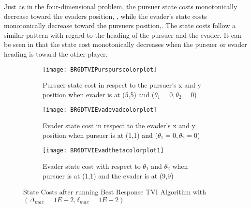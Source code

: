 Just as in the four-dimensional problem, the pursuer state costs monotonically decrease toward the evaders position, , while the evader's state costs monotonically decrease toward the pursuers position,. The state costs follow a similar pattern with regard to the heading of the pursuer and the evader. It can be seen in  that the state cost monotonically decreases when the pursuer or evader heading is toward the other player. 
\begin{figure}[h!]
\centering
\begin{subfigure}[t]{0.3\textwidth}
	\centering
	\texttt{[image: BR6DTVIPurspurscolorplot]}
	\caption{Pursuer state cost in respect to the pursuer's x and y position when evader is at (5,5) and ($\theta_1 = 0,\theta_2=0$)}
	\label{BR6DTVIPcp}
\end{subfigure}
\hfill
\begin{subfigure}[t]{0.3\textwidth}
	\centering
	\texttt{[image: BR6DTVIEvadevadcolorplot]}
	\caption{Evader state cost in respect to the evader's x and y position when pursuer is at (1,1) and ($\theta_1 = 0,\theta_2=0$)}
	\label{BR6DTVIEcp}
\end{subfigure}
\hfill
\begin{subfigure}[t]{0.3\textwidth}
	\centering
	\texttt{[image: BR6DTVIEvadthetacolorplot1]}
	\caption{Evader state cost with respect to $\theta_1$ and $\theta_2$ when pursuer is at (1,1) and the evader is at (9,9)}
	\label{BR6DTVITcp}
\end{subfigure}
\caption{State Costs after running Best Response TVI Algorithm with $(\Delta_{max} = 1E-2,\delta_{max} = 1E-2)$}
\label{BR6DTVIcp}
\end{figure}

